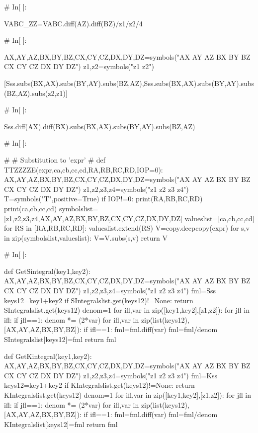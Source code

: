 # In[ ]:


VABC_ZZ=VABC.diff(AZ).diff(BZ)/z1/z2/4


# In[ ]:


AX,AY,AZ,BX,BY,BZ,CX,CY,CZ,DX,DY,DZ=symbols("AX AY AZ BX BY BZ CX CY CZ DX DY DZ") 
z1,z2=symbols("z1 z2")

[Sss.subs(BX,AX).subs(BY,AY).subs(BZ,AZ),Sss.subs(BX,AX).subs(BY,AY).subs(BZ,AZ).subs(z2,z1)]


# In[ ]:


Sss.diff(AX).diff(BX).subs(BX,AX).subs(BY,AY).subs(BZ,AZ)


# In[ ]:


#
#  Substitution to 'expr' 
#
def TTZZZZE(expr,ca,cb,cc,cd,RA,RB,RC,RD,IOP=0):
    AX,AY,AZ,BX,BY,BZ,CX,CY,CZ,DX,DY,DZ=symbols("AX AY AZ BX BY BZ CX CY CZ DX DY DZ")
    z1,z2,z3,z4=symbols("z1 z2 z3 z4")
    T=symbols("T",positive=True)
    if IOP!=0:
        print(RA,RB,RC,RD)
        print(ca,cb,cc,cd)
    symbolslist=[z1,z2,z3,z4,AX,AY,AZ,BX,BY,BZ,CX,CY,CZ,DX,DY,DZ]
    valueslist=[ca,cb,cc,cd]
    for RS in [RA,RB,RC,RD]:
        valueslist.extend(RS)
    V=copy.deepcopy(expr)
    for s,v in zip(symbolslist,valueslist):
        V=V.subs(s,v)
    return V
        


# In[ ]:


def GetSintegral(key1,key2):
    AX,AY,AZ,BX,BY,BZ,CX,CY,CZ,DX,DY,DZ=symbols("AX AY AZ BX BY BZ CX CY CZ DX DY DZ")
    z1,z2,z3,z4=symbols("z1 z2 z3 z4")
    fml=Sss
    keys12=key1+key2
    if SIntegralslist.get(keys12)!=None:
        return SIntegralslist.get(keys12)
    denom=1
    for ifl,var in zip([key1,key2],[z1,z2]):
        for jfl in ifl:
            if jfl==1:
                denom *= (2*var)
    for ifl,var in zip(list(keys12),[AX,AY,AZ,BX,BY,BZ]):
        if ifl==1:
            fml=fml.diff(var)
    fml=fml/denom
    SIntegralslist[keys12]=fml
    return fml

def GetKintegral(key1,key2):
    AX,AY,AZ,BX,BY,BZ,CX,CY,CZ,DX,DY,DZ=symbols("AX AY AZ BX BY BZ CX CY CZ DX DY DZ")
    z1,z2,z3,z4=symbols("z1 z2 z3 z4")
    fml=Kss
    keys12=key1+key2
    if KIntegralslist.get(keys12)!=None:
        return KIntegralslist.get(keys12)
    denom=1
    for ifl,var in zip([key1,key2],[z1,z2]):
        for jfl in ifl:
            if jfl==1:
                denom *= (2*var)
    for ifl,var in zip(list(keys12),[AX,AY,AZ,BX,BY,BZ]):
        if ifl==1:
            fml=fml.diff(var)
    fml=fml/denom
    KIntegralslist[keys12]=fml
    return fml

